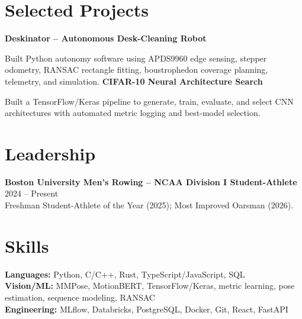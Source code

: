 \documentclass[letterpaper,10pt]{article}
\begin{document}
\section{Selected Projects}
\textbf{Deskinator -- Autonomous Desk-Cleaning Robot}\\[-2pt]\bi\item Built Python autonomy software using APDS9960 edge sensing, stepper odometry, RANSAC rectangle fitting, boustrophedon coverage planning, telemetry, and simulation.\ei
\textbf{CIFAR-10 Neural Architecture Search}\\[-2pt]\bi\item Built a TensorFlow/Keras pipeline to generate, train, evaluate, and select CNN architectures with automated metric logging and best-model selection.\ei
\section{Leadership}\textbf{Boston University Men's Rowing -- NCAA Division I Student-Athlete} \hfill 2024 -- Present\\Freshman Student-Athlete of the Year (2025); Most Improved Oarsman (2026).
\section{Skills}\textbf{Languages:} Python, C/C++, Rust, TypeScript/JavaScript, SQL\\\textbf{Vision/ML:} MMPose, MotionBERT, TensorFlow/Keras, metric learning, pose estimation, sequence modeling, RANSAC\\\textbf{Engineering:} MLflow, Databricks, PostgreSQL, Docker, Git, React, FastAPI
\end{document}
